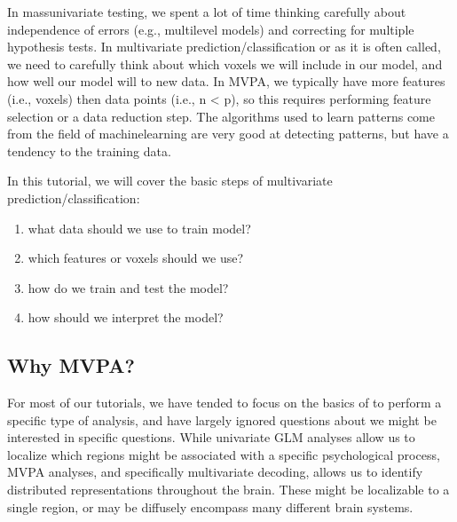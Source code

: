 \documentclass[letterpaper,10pt,english]{sphinxmanual}
\begin{document}
In mass\sphinxhyphen{}univariate testing, we spent a lot of time thinking carefully about independence of errors (e.g., multi\sphinxhyphen{}level models) and correcting for multiple hypothesis tests. In multivariate prediction/classification or  as it is often called, we need to carefully think about  \sphinxhyphen{}  which voxels we will include in our model, and  \sphinxhyphen{} how well our model will  to new data. In MVPA, we typically have more features (i.e., voxels) then data points (i.e., n \textless{} p), so this requires performing feature selection or a data reduction step. The algorithms used to learn patterns come from the field of machine\sphinxhyphen{}learning are very good at detecting patterns, but have a tendency to  the training data.

In this tutorial, we will cover the basic steps of multivariate prediction/classification:
\begin{enumerate}
%
\item {} 
 \sphinxhyphen{} what data should we use to train model?

\item {} 
 \sphinxhyphen{} which features or voxels should we use?

\item {} 
 \sphinxhyphen{} how do we train and test the model?

\item {} 
 \sphinxhyphen{} how should we interpret the model?

\end{enumerate}


\subsection{Why MVPA?}
\label{\detokenize{content/Multivariate_Prediction:why-mvpa}}
For most of our tutorials, we have tended to focus on the basics of  to perform a specific type of analysis, and have largely ignored questions about  we might be interested in specific questions. While univariate GLM analyses allow us to localize which regions might be associated with a specific psychological process, MVPA analyses, and specifically multivariate decoding, allows us to identify distributed representations throughout the brain. These might be localizable to a single region, or may be diffusely encompass many different brain systems.
\end{document}
